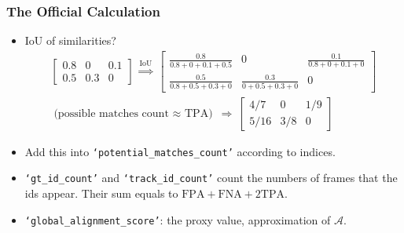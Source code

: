 \documentclass[slidetop, mathserif]{beamer}
\begin{document}
\begin{frame}
	\frametitle{The Official Calculation}
	\begin{itemize}
		\item IoU of similarities?
		      \begin{align*}
		      	\begin{bmatrix}	
		      	0.8                       & 0                       & 0.1                     \\
		      	0.5                       & 0.3                     & 0                       
		      	\end{bmatrix}
		      	\ \stackrel{\text{IoU}}{\Rightarrow}\ 
		      	\begin{bmatrix}
		      	\frac{0.8}{0.8+0+0.1+0.5} & 0                       & \frac{0.1}{0.8+0+0.1+0} \\
		      	\frac{0.5}{0.8+0.5+0.3+0} & \frac{0.3}{0+0.5+0.3+0} & 0                       
		      	\end{bmatrix} \\
		      	\text{(possible matches count $\approx$ TPA)}~ \Rightarrow ~ 
		      	\begin{bmatrix}
		      	4/7                       & 0                       & 1/9                     \\
		      	5/16                      & 3/8                     & 0                       
		      	\end{bmatrix}
		      \end{align*}
		\item Add this into {\scriptsize\tt `potential\_matches\_count'} according to indices.
		\item {\scriptsize\tt `gt\_id\_count'} and {\scriptsize\tt `track\_id\_count'} count
		      the numbers of frames that the ids appear. Their sum equals to $\text{FPA}+\text{FNA}+2\text{TPA}$.
		\item {\scriptsize\tt `global\_alignment\_score'}: the proxy value, approximation of $\mathcal A$.
		      		
	\end{itemize}
\end{frame}
\end{document}
